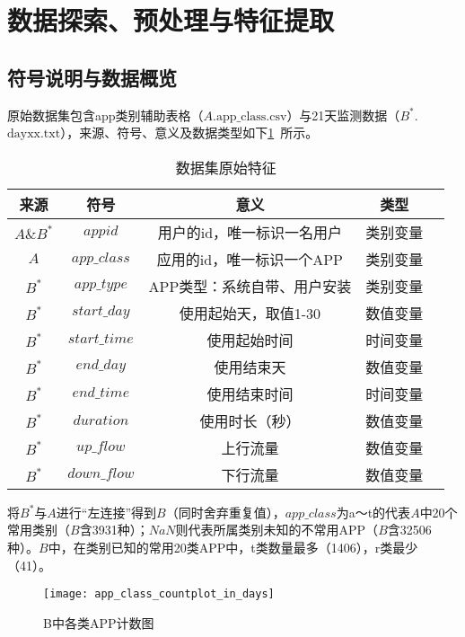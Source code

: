 \documentclass[withoutpreface,bwprint]{cumcmthesis}
\begin{document}
\newpage
\section{数据探索、预处理与特征提取}

\subsection{符号说明与数据概览}

原始数据集包含app类别辅助表格（$A$.$\text{app\_class.csv}$）与21天监测数据（$B^*$.$\text{dayxx.txt}$），来源、符号、意义及数据类型如下\cref{tab:001}~所示。

\begin{table}[!htbp]
    \caption{数据集原始特征}\label{tab:001} \centering
    \begin{tabular}{ccccc}
        \toprule[1.5pt]
        来源       & 符号            & 意义              & 类型   \\
        \midrule[1pt]
        $A\&B^*$ & $appid$       & 用户的id，唯一标识一名用户  & 类别变量 \\
        $A$      & $app\_class$  & 应用的id，唯一标识一个APP & 类别变量 \\
        $B^*$    & $app\_type$   & APP类型：系统自带、用户安装 & 类别变量 \\
        $B^*$    & $start\_day$  & 使用起始天，取值1-30    & 数值变量 \\
        $B^*$    & $start\_time$ & 使用起始时间          & 时间变量 \\
        $B^*$    & $end\_day$    & 使用结束天           & 数值变量 \\
        $B^*$    & $end\_time$   & 使用结束时间          & 时间变量 \\
        $B^*$    & $duration$    & 使用时长（秒）         & 数值变量 \\
        $B^*$    & $up\_flow$    & 上行流量            & 数值变量 \\
        $B^*$    & $down\_flow$  & 下行流量            & 数值变量 \\
        \bottomrule[1.5pt]
    \end{tabular}
\end{table}

将$B^*$与$A$进行“左连接”得到$B$（同时舍弃重复值），$app\_class$为a～t的代表$A$中20个常用类别（$B$含3931种）；$NaN$则代表所属类别未知的不常用APP（$B$含32506种）。$B$中，在类别已知的常用20类APP中，t类数量最多（1406），r类最少（41）。

\begin{figure}[!htbp]
    \centering
    \texttt{[image: app\_class\_countplot\_in\_days]}
    \caption{B中各类APP计数图}
    \label{fig:001}
\end{figure}
\end{document}
